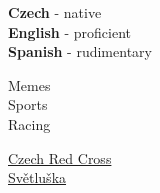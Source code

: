 \documentclass[9pt]{developercv} %
\begin{document}
\begin{minipage}[t]{0.2\textwidth}
	\vspace{-\baselineskip} %

	
	\textbf{Czech} - native\\
	\textbf{English} - proficient\\
	\textbf{Spanish} - rudimentary\\
\end{minipage}
\hfill
\begin{minipage}[t]{0.2\textwidth}
	\vspace{-\baselineskip} %
	

	Memes\\
	Sports\\
	Racing
\end{minipage}
\hfill
\begin{minipage}[t]{0.15\textwidth}
	\vspace{-\baselineskip} %
	
	
	\href{https://cckova.cz/}{Czech Red Cross}\\
	\href{https://svetluska.rozhlas.cz/}{Světluška}
\end{minipage}
\end{document}
